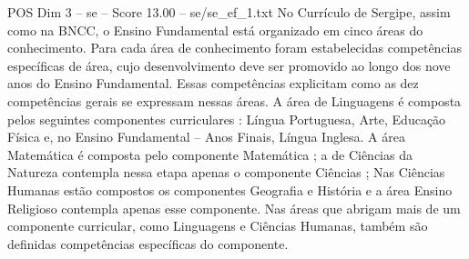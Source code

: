 \begin{textsample}{POS Dim 3 – se – Score 13.00 – se/se\_ef\_1.txt}
No Currículo de Sergipe, assim como na BNCC, o Ensino Fundamental está organizado em cinco áreas do conhecimento.
Para cada área de conhecimento foram estabelecidas competências específicas de área, cujo desenvolvimento deve ser promovido ao longo dos nove anos do Ensino Fundamental.
Essas competências explicitam como as dez competências gerais se expressam nessas áreas.
A área de Linguagens é composta pelos seguintes componentes curriculares : Língua Portuguesa, Arte, Educação Física e, no Ensino Fundamental – Anos Finais, Língua Inglesa.
A área Matemática é composta pelo componente Matemática ; a de Ciências da Natureza contempla nessa etapa apenas o componente Ciências ; Nas Ciências Humanas estão compostos os componentes Geografia e História e a área Ensino Religioso contempla apenas esse componente.
Nas áreas que abrigam mais de um componente curricular, como Linguagens e Ciências Humanas, também são definidas competências específicas do componente.

\end{textsample}
